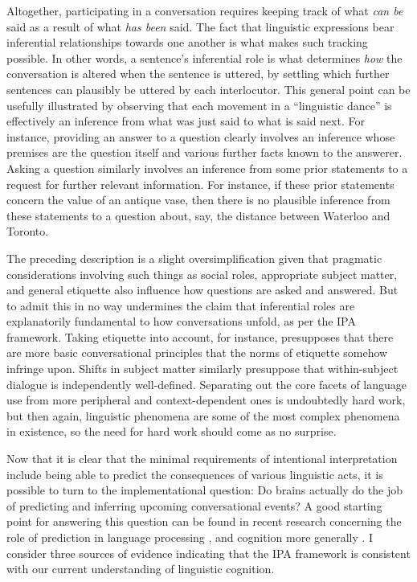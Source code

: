 Altogether, participating in a conversation requires keeping track of what \textit{can be} said as a result of what \textit{has been} said. The fact that linguistic expressions bear inferential relationships towards one another is what makes such tracking possible. In other words, a sentence's inferential role is what determines \textit{how} the conversation is altered when the sentence is uttered, by settling which further sentences can plausibly be uttered by each interlocutor. This general point can be usefully illustrated by observing that each movement in a ``linguistic dance'' is effectively an inference from what was just said to what is said next. For instance, providing an answer to a question clearly involves an inference whose premises are the question itself and various further facts known to the answerer. Asking a question similarly involves an inference from some prior statements to a request for further relevant information. For instance, if these prior statements concern the value of an antique vase, then there is no plausible inference from these statements to a question about, say, the distance between Waterloo and Toronto.  

The preceding description is a slight oversimplification given that pragmatic considerations involving such things as social roles, appropriate subject matter, and general etiquette also influence how questions are asked and answered. But to admit this in no way undermines the claim that inferential roles are explanatorily fundamental to how conversations unfold, as per the IPA framework. Taking etiquette into account, for instance, presupposes that there are more basic conversational principles that the norms of etiquette somehow infringe upon. Shifts in subject matter similarly presuppose that within-subject dialogue is independently well-defined. Separating out the core facets of language use from more peripheral and context-dependent ones is undoubtedly hard work, but then again, linguistic phenomena are some of the most complex phenomena in existence, so the need for hard work should come as no surprise.

Now that it is clear that the minimal requirements of intentional interpretation include being able to predict the consequences of various linguistic acts, it is possible to turn to the implementational question: Do brains actually do the job of predicting and inferring upcoming conversational events? A good starting point for answering this question can be found in recent research concerning the role of prediction in language processing \citep{Pickering:2013,Pickering:2007,Christiansen:2015}, and cognition more generally \citep{clark:2013}. I consider three sources of evidence indicating that the IPA framework is consistent with our current understanding of linguistic cognition.

